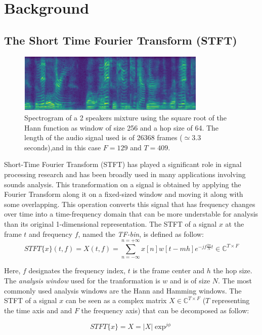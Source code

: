 \documentclass[master, tikz, final,11pt, dvipdfmx]{iscs-thesis}
\begin{document}
\chapter{Background}
\section{The Short Time Fourier Transform (STFT)}

\begin{figure}[b]
\centering
\includegraphics[width=0.8\textwidth]{xmix}
\caption[Spectrogram of a 2 speaker mixture]{Spectrogram of a 2 speakers mixture using the square root of the Hann function as window of size 256 and a hop size of 64. The length of the audio signal used is of 26368 frames ($\simeq 3.3$ seconds),and in this case $F = 129$ and $T = 409$.}
\label{fig:spectrogram} 
\end{figure}


Short-Time Fourier Transform (STFT) has played a significant role in signal processing research and has been broadly used in many applications involving sounds analysis.
This transformation on a signal is obtained by applying the Fourier Transform along it on a fixed-sized window and moving it along with some overlapping. This operation converts this signal that has frequency changes over time into a time-frequency domain that can be more understable for analysis than its original 1-dimensional representation.
The STFT of a signal $x$ at the frame $t$ and frequency $f$, named the \textit{TF-bin}, is defined as follow:
\[
	STFT\{x\}(t,f) = X(t,f) = \sum_{n=-\infty}^{n=+\infty}x[n]w[t-mh]e^{-jf\frac{2\pi}{N}t } \in \mathbb{C}^{T\times F}
\]

Here, $f$ designates the frequency index, $t$ is the frame center and $h$ the hop size. The \textit{analysis window} used for the tranformation is $w$ and is of size $N$. The most commonly used analysis windows are the Hann and Hamming windows.
The STFT of a signal $x$ can be seen as a complex matrix $X \in \mathbb{C}^{T\times F}$ ($T$ representing the time axis and and $F$ the frequency axis) that can be decomposed as follow:

\[
	STFT\{x\} = X = |X|\exp^{j\phi}
\]
\end{document}
